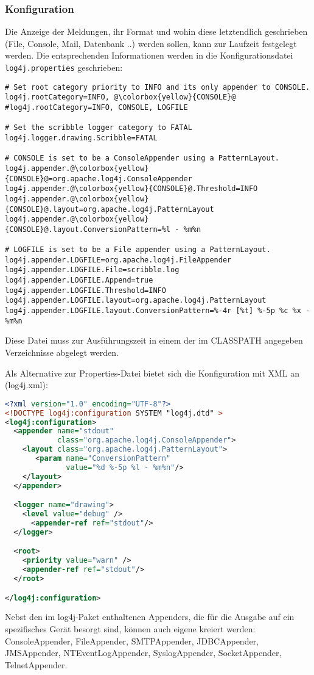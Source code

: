 \subsubsection{Konfiguration}
Die Anzeige der Meldungen, ihr Format und wohin diese letztendlich
geschrieben (File, Console, Mail, Datenbank ..) werden sollen, kann zur
Laufzeit festgelegt werden. Die entsprechenden
Informationen werden in die Konfigurationsdatei \verb+log4j.properties+
geschrieben:
\begin{lstlisting}[escapechar=@]
# Set root category priority to INFO and its only appender to CONSOLE.
log4j.rootCategory=INFO, @\colorbox{yellow}{CONSOLE}@
#log4j.rootCategory=INFO, CONSOLE, LOGFILE

# Set the scribble logger category to FATAL
log4j.logger.drawing.Scribble=FATAL

# CONSOLE is set to be a ConsoleAppender using a PatternLayout.
log4j.appender.@\colorbox{yellow}{CONSOLE}@=org.apache.log4j.ConsoleAppender
log4j.appender.@\colorbox{yellow}{CONSOLE}@.Threshold=INFO
log4j.appender.@\colorbox{yellow}{CONSOLE}@.layout=org.apache.log4j.PatternLayout
log4j.appender.@\colorbox{yellow}{CONSOLE}@.layout.ConversionPattern=%l - %m%n

# LOGFILE is set to be a File appender using a PatternLayout.
log4j.appender.LOGFILE=org.apache.log4j.FileAppender
log4j.appender.LOGFILE.File=scribble.log
log4j.appender.LOGFILE.Append=true
log4j.appender.LOGFILE.Threshold=INFO
log4j.appender.LOGFILE.layout=org.apache.log4j.PatternLayout
log4j.appender.LOGFILE.layout.ConversionPattern=%-4r [%t] %-5p %c %x - %m%n
\end{lstlisting}
Diese Datei muss zur Ausführungszeit in einem der im CLASSPATH angegeben
Verzeichnisse abgelegt werden.

\newslide
Als Alternative zur Properties-Datei bietet sich die Konfiguration mit
XML an (log4j.xml):
\begin{lstlisting}[language=xml]
<?xml version="1.0" encoding="UTF-8"?>
<!DOCTYPE log4j:configuration SYSTEM "log4j.dtd" >
<log4j:configuration>
  <appender name="stdout"
            class="org.apache.log4j.ConsoleAppender">
    <layout class="org.apache.log4j.PatternLayout">
       <param name="ConversionPattern"
              value="%d %-5p %l - %m%n"/>
    </layout>
  </appender>

  <logger name="drawing">
    <level value="debug" />
      <appender-ref ref="stdout"/>
  </logger>

  <root>
    <priority value="warn" />
    <appender-ref ref="stdout"/>
  </root>

</log4j:configuration>
\end{lstlisting}
Nebst den im log4j-Paket enthaltenen Appenders, die für die Ausgabe auf ein
spezifisches Gerät besorgt sind, können auch eigene kreiert werden:
ConsoleAppender, FileAppender, SMTPAppender, JDBCAppender, JMSAppender,
NTEventLogAppender, SyslogAppender, SocketAppender, TelnetAppender.
\newslide

